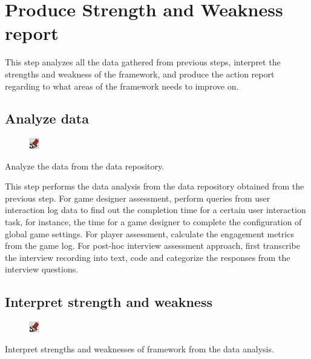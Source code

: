 \documentclass[11pt,oneside]{book}
\begin{document}
\chapter{Produce Strength and Weakness report}

This step analyzes all the data gathered from previous steps, interpret the strengths and weakness of the framework, 
and produce the action report regarding to what areas of the framework needs to improve on.

\section{Analyze data}
\begin{shadebox}
\begin{figure}
\vspace{-15pt}\hspace{-10pt}
    \includegraphics[width=0.04\textwidth]{note-icon}
\end{figure}
Analyze the data from the data repository.
\end{shadebox}
This step performs the data analysis from the data repository obtained from the previous step. For game designer assessment, 
perform queries from user interaction log data to find out the completion time for a certain user interaction task, for instance, the 
time for a game designer to complete the configuration of global game settings. For player assessment, calculate the 
engagement metrics from the game log. For post-hoc interview assessment approach, first transcribe the interview recording into 
text, code and categorize the responses from the interview questions. 
   
\section{Interpret strength and weakness}
\begin{shadebox}
\begin{figure}
\vspace{-15pt}\hspace{-10pt}
    \includegraphics[width=0.04\textwidth]{note-icon}
\end{figure}
Interpret strengths and weaknesses of framework from the data analysis.
\end{shadebox}
\end{document}
